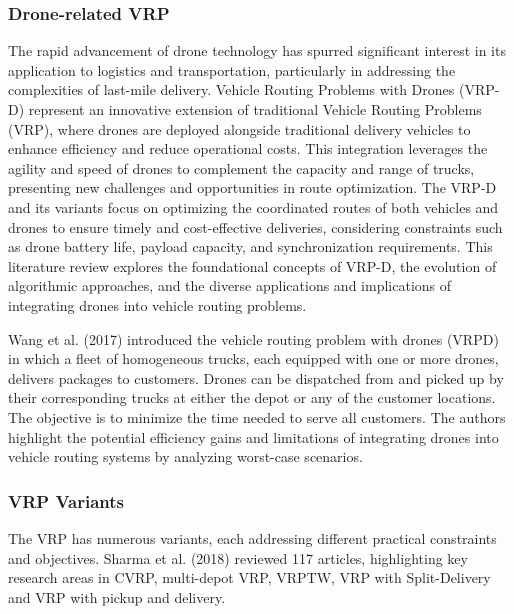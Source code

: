 \documentclass[twocolumn]{article}
\begin{document}
	\subsubsection{Drone-related VRP}
	The rapid advancement of drone technology has spurred significant interest in its application to logistics and transportation, particularly in addressing the complexities of last-mile delivery. Vehicle Routing Problems with Drones (VRP-D) represent an innovative extension of traditional Vehicle Routing Problems (VRP), where drones are deployed alongside traditional delivery vehicles to enhance efficiency and reduce operational costs. This integration leverages the agility and speed of drones to complement the capacity and range of trucks, presenting new challenges and opportunities in route optimization. The VRP-D and its variants focus on optimizing the coordinated routes of both vehicles and drones to ensure timely and cost-effective deliveries, considering constraints such as drone battery life, payload capacity, and synchronization requirements. This literature review explores the foundational concepts of VRP-D, the evolution of algorithmic approaches, and the diverse applications and implications of integrating drones into vehicle routing problems.
	\par 
	Wang et al. (2017) introduced the vehicle routing problem with drones (VRPD) in which a fleet of homogeneous trucks, each equipped with one or more drones, delivers packages to customers. Drones can be dispatched from and picked up by their corresponding trucks at either the depot or any of the customer locations. The objective is to minimize the time needed to serve all customers. The authors highlight the potential efficiency gains and limitations of integrating drones into vehicle routing systems by analyzing worst-case scenarios.
	\subsubsection{VRP Variants}
	The VRP has numerous variants, each addressing different practical constraints and objectives.
	Sharma et al. (2018) reviewed 117 articles, highlighting key research areas in CVRP, multi-depot VRP, VRPTW, VRP with Split-Delivery and VRP with pickup and delivery.
	
\end{document}
